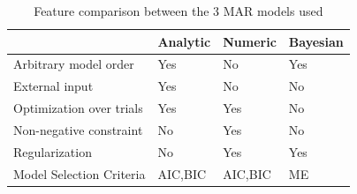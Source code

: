 \documentclass[a4paper,10pt]{article}
\begin{document}
\begin{table}[h!]
\centering
\begin{tabular}{l | l | l | l}
                            & Analytic & Numeric & Bayesian \\ \hline
  Arbitrary model order     & Yes & No & Yes \\ \hline
  External input            & Yes & No & No \\ \hline
  Optimization over trials  & Yes & Yes & No \\ \hline
  Non-negative constraint   & No  & Yes & No \\ \hline
  Regularization            & No  & Yes & Yes \\ \hline
  Model Selection Criteria  & AIC,BIC  & AIC,BIC & ME \\
\end{tabular}
\caption{Feature comparison between the 3 MAR models used}
\label{fig:features_mar_models}
\end{table}
\end{document}
